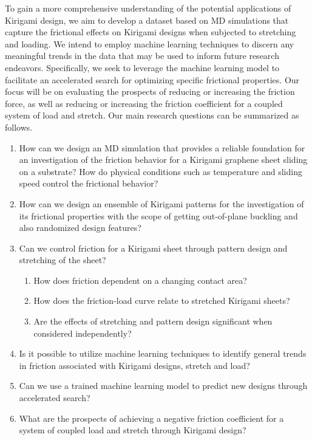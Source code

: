 To gain a more comprehensive understanding of the potential applications of Kirigami design, we aim to develop a dataset based on \acrshort{MD} simulations that capture the frictional effects on Kirigami designs when subjected to stretching and loading. We intend to employ machine learning techniques to discern any meaningful trends in the data that may be used to inform future research endeavors. Specifically, we seek to leverage the machine learning model to facilitate an accelerated search for optimizing specific frictional properties. Our focus will be on evaluating the prospects of reducing or increasing the friction force, as well as reducing or increasing the friction coefficient for a coupled system of load and stretch. Our main research questions can be summarized as follows.


\begin{enumerate}
  \item  How can we design an \acrshort{MD} simulation that provides a reliable foundation for an investigation of the friction behavior for a Kirigami graphene sheet sliding on a substrate? How do physical conditions such as temperature and sliding speed control the frictional behavior?
  \item How can we design an ensemble of Kirigami patterns for the investigation of its frictional properties with the scope of getting out-of-plane buckling and also randomized design features?   
  \item Can we control friction for a Kirigami sheet through pattern design and stretching of the sheet?
  \begin{enumerate}
    \item How does friction dependent on a changing contact area?
    \item How does the friction-load curve relate to stretched Kirigami sheets?
    \item Are the effects of stretching and pattern design significant when considered independently?
  \end{enumerate}
  \item Is it possible to utilize machine learning techniques to identify general trends in friction associated with Kirigami designs, stretch and load?
  \item Can we use a trained machine learning model to predict new designs through accelerated search?
  \item What are the prospects of achieving a negative friction coefficient for a system of coupled load and stretch through Kirigami design?
\end{enumerate}


